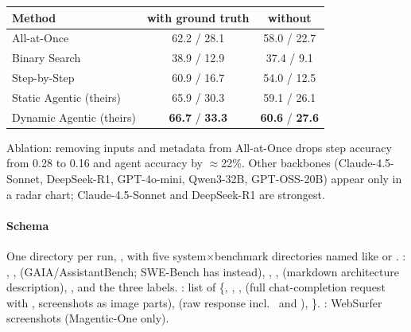 \begin{center}\small
\begin{tabular}{@{}lcc@{}}\toprule
Method & with ground truth & without\\\midrule
All-at-Once & 62.2 / 28.1 & 58.0 / 22.7\\
Binary Search & 38.9 / 12.9 & 37.4 / 9.1\\
Step-by-Step & 60.9 / 16.7 & 54.0 / 12.5\\
Static Agentic (theirs) & 65.9 / 30.3 & 59.1 / 26.1\\
Dynamic Agentic (theirs) & \textbf{66.7} / \textbf{33.3} & \textbf{60.6} / \textbf{27.6}\\\bottomrule
\end{tabular}
\end{center}
Ablation: removing inputs and metadata from All-at-Once drops step accuracy from 0.28 to 0.16 and agent accuracy by $\approx$22\%. Other backbones (Claude-4.5-Sonnet, DeepSeek-R1, GPT-4o-mini, Qwen3-32B, GPT-OSS-20B) appear only in a radar chart; Claude-4.5-Sonnet and DeepSeek-R1 are strongest.

\paragraph{Schema} One directory per run, , with five system$\times$benchmark directories named like  or . : , ,  (GAIA/\allowbreak AssistantBench; SWE-Bench has  instead), , ,  (markdown architecture description), , and the three labels. : list of \{, , ,  (full chat-completion request with , screenshots as image parts),  (raw response incl.\  and ), \}. : WebSurfer screenshots (Magentic-One only).

